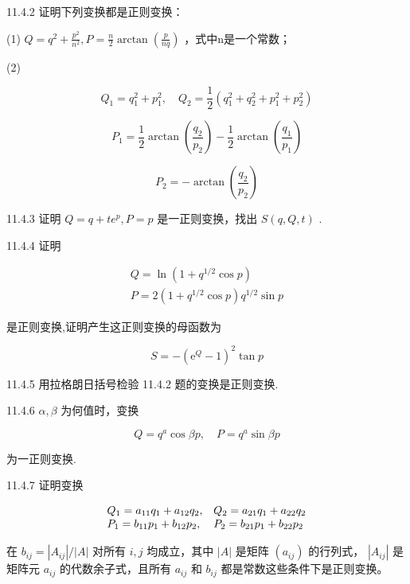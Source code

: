 \begin{problem}{11.4.2}
证明下列变换都是正则变换：

(1) $Q=q^{2}+\frac{p^{2}}{n^{2}},P=\frac{n}{2}\arctan\left(\frac{p}{nq}\right)$ ，式中n是一个常数；

(2) 

\[
Q _ {1} = q _ {1} ^ {2} + p _ {1} ^ {2}, \quad Q _ {2} = \frac {1}{2} (q _ {1} ^ {2} + q _ {2} ^ {2} + p _ {1} ^ {2} + p _ {2} ^ {2})
\]

\[
P _ {1} = \frac {1}{2} \arctan \left(\frac {q _ {2}}{p _ {2}}\right) - \frac {1}{2} \arctan \left(\frac {q _ {1}}{p _ {1}}\right)
\]

\[
P _ {2} = - \arctan \left(\frac {q _ {2}}{p _ {2}}\right)
\]
\end{problem}
\clearpage


\begin{problem}{11.4.3}
证明 $Q = q + te^{p}, P = p$ 是一正则变换，找出 $S(q, Q, t)$ .
\end{problem}
\clearpage


\begin{problem}{11.4.4}
证明

\[
\begin{array}{c} Q = \ln (1 + q ^ {1 / 2} \cos p) \\ P = 2 (1 + q ^ {1 / 2} \cos p) q ^ {1 / 2} \sin p \end{array}
\]

是正则变换,证明产生这正则变换的母函数为

\[
S = - \left(\mathrm{e} ^ {Q} - 1\right) ^ {2} \tan p
\]
\end{problem}
\clearpage


\begin{problem}{11.4.5}
用拉格朗日括号检验 11.4.2 题的变换是正则变换.
\end{problem}
\clearpage


\begin{problem}{11.4.6}
$\alpha, \beta$ 为何值时，变换

\[
Q = q ^ {a} \cos \beta p, \quad P = q ^ {a} \sin \beta p
\]

为一正则变换.
\end{problem}
\clearpage


\begin{problem}{11.4.7}
证明变换

\[
\begin{array}{l l} Q _ {1} = a _ {1 1} q _ {1} + a _ {1 2} q _ {2}, & Q _ {2} = a _ {2 1} q _ {1} + a _ {2 2} q _ {2} \\ P _ {1} = b _ {1 1} p _ {1} + b _ {1 2} p _ {2}, & P _ {2} = b _ {2 1} p _ {1} + b _ {2 2} p _ {2} \end{array}
\]

在 $b_{ij} = |A_{ij}| / |A|$ 对所有 $i, j$ 均成立，其中 $|A|$ 是矩阵 $(a_{ij})$ 的行列式， $|A_{ij}|$ 是矩阵元 $a_{ij}$ 的代数余子式，且所有 $a_{ij}$ 和 $b_{ij}$ 都是常数这些条件下是正则变换。
\end{problem}
\clearpage


